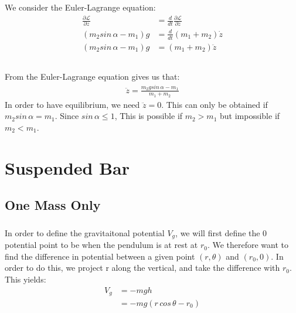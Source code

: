 \documentclass{article}
\begin{document}
We consider the Euler-Lagrange equation:
\begin{align*}
	\frac{\partial \mathcal{L}}{\partial z} &= \frac{d}{dt}\frac{\partial \mathcal{L}}{\partial \dot{z}}\\
	 (m_2sin\,\alpha - m_1)g &= \frac{d}{dt}(m_1 + m_2)\dot{z}\\
	 (m_2sin\,\alpha - m_1)g &= (m_1 + m_2)\ddot{z}
\end{align*}

\subsection{} %

From the Euler-Lagrange equation gives us that:
\begin{align*}
	\ddot{z} = \frac{ m_2gsin\,\alpha  - m_1}{m_1 + m_2}
\end{align*}
In order to have equilibrium, we need $\ddot{z} = 0$. This can only be obtained if $m_2sin\,\alpha = m_1$. Since $sin\,\alpha \leq 1$, This is possible if $m_2 > m_1$ but impossible if $m_2 < m_1$.

\section{Suspended Bar}

\subsection{One Mass Only}

\subsubsection{} %

In order to define the gravitaitonal potential $V_g$, we will first define the 0 potential point to be when the pendulum is at rest at $r_0$. We therefore want to find the difference in potential between a given point $(r,\theta)$ and $(r_0,0)$. In order to do this, we project r along the vertical, and take the difference with $r_0$. This yields:
\begin{align*}
	V_g &= -mgh\\
	&= -mg(r\,cos\,\theta - r_0)
\end{align*}

\subsubsection{} %
\end{document}
